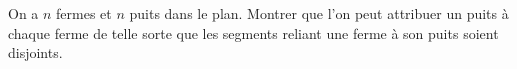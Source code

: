On a $n$ fermes et $n$ puits dans le plan. Montrer que l'on peut attribuer un puits à chaque ferme de telle sorte que les segments reliant une ferme à son puits soient disjoints.
